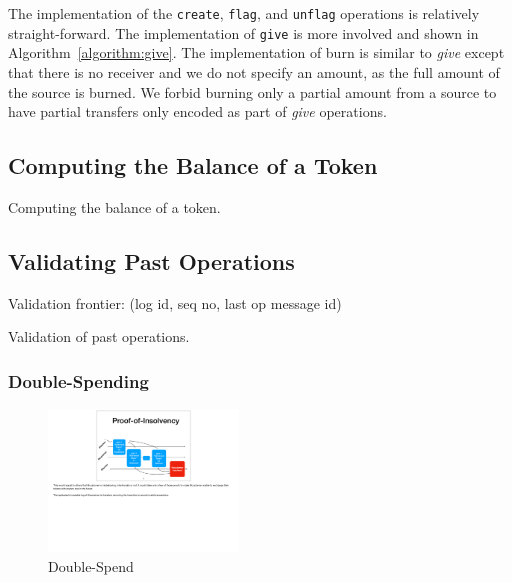 \documentclass[sigplan,screen,10pt]{acmart}
\begin{document}
The implementation of the \texttt{create}, \texttt{flag}, and \texttt{unflag} operations is relatively straight-forward. The implementation of \texttt{give} is more involved and shown in Algorithm~\ref{algorithm:give}. The implementation of burn is similar to \textit{give} except that there is no receiver and we do not specify an amount, as the full amount of the source is burned. We forbid burning only a partial amount from a source to have partial transfers only encoded as part of \textit{give} operations.

\subsection{Computing the Balance of a Token}

\begin{algorithm}

\caption{Computing the balance of a token.}
\label{algorithm:balance}
\end{algorithm}

\subsection{Validating Past Operations}

Validation frontier: (log id, seq no, last op message id)

\begin{algorithm}

\caption{Validation of past operations.}
\label{algorithm:validation}
\end{algorithm}

\subsubsection{Double-Spending}


\begin{figure}[hb]
\includegraphics[width=0.45\textwidth]{figures/double-spend}
\caption{Double-Spend}
\end{figure}
\end{document}
